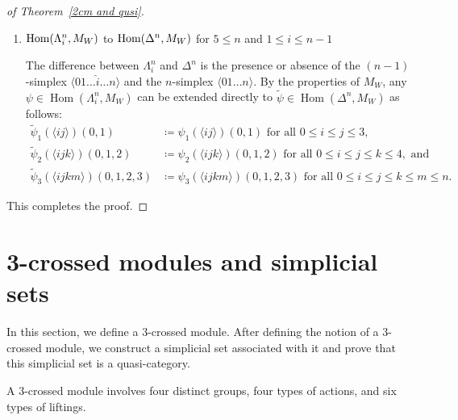 \documentclass{tac}
\begin{document}
\begin{proof}[of Theorem~\ref{2cm and qusi}]
\begin{enumerate}
\item ${\rm Hom}(\Lambda^n_i, M_W)$ to ${\rm Hom}(\Delta^n, M_W)$ for $5\le n$ and $1 \le i \le n-1$

The difference between \( \Lambda^n_i \) and \( \Delta^n \) is the presence or absence of the \((n-1)\)-simplex \( \langle 01 \dots \hat{i} \dots n \rangle \) and the \( n \)-simplex \( \langle 01 \dots n \rangle \).
By the properties of \( M_W \), any \( \psi \in \operatorname{Hom}(\Lambda^n_i, M_W) \) can be extended directly to  
\( \tilde{\psi} \in \operatorname{Hom}(\Delta^n, M_W) \) as follows:
\begin{align*}
\tilde{\psi}_1(\langle ij \rangle)(0,1) &\coloneqq {\psi}_1(\langle ij \rangle)(0,1)  \text{ for all }  0\le i\le j \le 3, \\
\tilde{\psi}_2(\langle ijk \rangle)(0,1,2) &\coloneqq {\psi}_2(\langle ijk \rangle)(0,1,2)  \text{ for  all } 0\le i\le j \le k\le 4, \text{ and}\\
\tilde{\psi}_3(\langle ijkm \rangle)(0,1,2,3) &\coloneqq {\psi}_3(\langle ijkm \rangle)(0,1,2,3) \text{ for all } 0\le i\le j \le k\le m \le n.
\end{align*}
\end{enumerate}
This completes the proof.
\end{proof}

\section{3-crossed modules and simplicial sets}\label{sec-3-crossed module and sset}

In this section, we define a 3-crossed module. After defining the notion of a 3-crossed module, we construct a simplicial set associated with it and prove that this simplicial set is a quasi-category.

A 3-crossed module involves four distinct groups, four types of actions, and six types of liftings.
\end{document}
